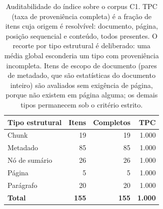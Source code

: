 \begin{table}[htb]
\centering
\caption{Auditabilidade do índice sobre o corpus C1. TPC (taxa de proveniência completa) é a fração de itens cuja origem é resolvível: documento, página, posição sequencial e conteúdo, todos presentes. O recorte por tipo estrutural é deliberado: uma média global esconderia um tipo com proveniência incompleta. Itens de escopo de documento (pares de metadado, que são estatísticas do documento inteiro) são avaliados sem exigência de página, porque não existem em página alguma; os demais tipos permanecem sob o critério estrito.}
\label{tab:provenance}
\begin{tabular}{lrrr}
\hline
Tipo estrutural & Itens & Completos & TPC \\
\hline
Chunk & 19 & 19 & 1.000 \\
Metadado & 85 & 85 & 1.000 \\
Nó de sumário & 26 & 26 & 1.000 \\
Página & 5 & 5 & 1.000 \\
Parágrafo & 20 & 20 & 1.000 \\
\hline
\textbf{Total} & \textbf{155} & \textbf{155} & \textbf{1.000} \\
\hline
\end{tabular}
\end{table}
